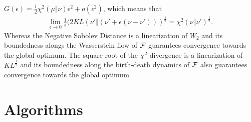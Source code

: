 $G(\epsilon) =\frac{1}{2} \chi^2(\mu\Vert \nu) \epsilon^2 + o(\epsilon^2)$, which means that  
\begin{align}
	\lim_{\epsilon \rightarrow 0} \frac{1}{\epsilon}(2KL(\nu' \Vert (\nu'+\epsilon(\nu-\nu') ) )^{\frac{1}{2}}   = \chi^2(\nu\Vert \nu')^\frac{1}{2}.
\end{align}
Whereas the Negative Sobolev Distance is  a linearization of $W_2$ and its boundedness alongs the Wasserstein flow of ${{\mathcal F}}$ guarantees convergence towards the global optimum.  The square-root of the $\chi^2$ divergence is  a linearization of $KL^{\frac{1}{2}}$ and its boundedness along the birth-death dynamics of ${{\mathcal F}}$ also guarantees convergence towards the global optimum.  




\section{Algorithms}\label{sec:appendix_algorithms}



